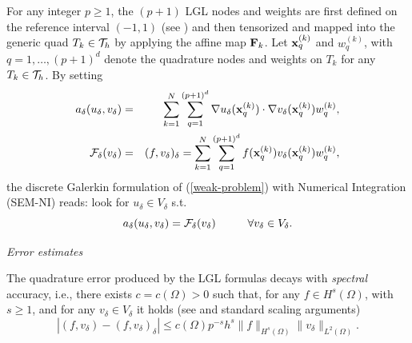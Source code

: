\documentclass[11pt]{article}
\begin{document}
For any integer $p\geq 1$, the $(p+1)$ LGL nodes and weights
are first defined on the reference interval $(-1,1)$ 
(see \cite[formula (2.3.12)]{chqz06}) and then 
tensorized and mapped into the generic quad $T_k\in{\cal T}_h$ by applying 
the affine map ${\bf F}_{k}$. Let
 ${\bf x}_q^{(k)}$ and $w_q^{(k)}$,
with $q=1,\ldots,(p+1)^d$ denote
the quadrature nodes and weights on $T_k$ for any $T_k\in{\cal T}_h$.
By setting
\begin{eqnarray}\label{forme_discrete}
a_\delta(u_\delta,v_\delta)&=& \displaystyle
\sum_{k=1}^{N} \sum_{q=1}^{(p+1)^d} 
\nabla u_\delta ({\bf x}_q^{(k)})\cdot \nabla v_\delta ({\bf x}_q^{(k)})
w_q^{(k)},\\
{\cal F}_\delta(v_\delta)&=& \displaystyle
(f,v_\delta)_\delta=\sum_{k=1}^{N} \sum_{q=1}^{(p+1)^d} 
f({\bf x}_q^{(k)}) v_\delta ({\bf x}_q^{(k)})w_q^{(k)},
\end{eqnarray}
the discrete Galerkin formulation of (\ref{weak-problem}) with Numerical 
Integration (SEM-NI) reads:
look for $u_\delta\in V_\delta$
s.t.
\begin{equation}\label{gni-weak-problem}
a_\delta(u_\delta,v_\delta)={\cal F}_\delta(v_\delta)  \hskip 1.cm
\forall v_\delta\in V_\delta.
\end{equation}


\null
\emph{Error estimates}

The quadrature error produced by 
the LGL formulas decays with \emph{spectral} accuracy, i.e.,
there exists $c=c(\Omega)>0$ such that, for any
 $f\in H^s(\Omega)$, with  $s\geq 1$, and for any
$v_\delta\in V_\delta$ it holds
(see \cite[Sect. 5.4.3]{chqz06} and standard scaling arguments)
\begin{equation}\label{quad_error_sem}
\left|(f,v_\delta)-(f,v_\delta)_\delta\right|\leq c(\Omega)
 p^{-s} 
h^s\|f\|_{H^s(\Omega)} \|v_\delta\|_{L^2(\Omega)}.
\end{equation}
\end{document}
